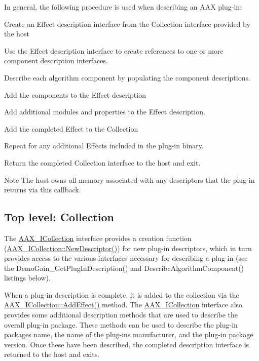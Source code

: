  In general, the following procedure is used when describing an A\+A\+X plug-\/in\+: 
\begin{DoxyEnumerate}
\item Create an Effect description interface from the Collection interface provided by the host  
\item Use the Effect description interface to create references to one or more component description interfaces.  
\item Describe each algorithm component by populating the component descriptions.  
\item Add the components to the Effect description 
\item Add additional modules and properties to the Effect description.  
\item Add the completed Effect to the Collection  
\item Repeat for any additional Effects included in the plug-\/in binary.  
\item Return the completed Collection interface to the host and exit.  
\end{DoxyEnumerate}

 \begin{DoxyNote}{Note}
The host owns all memory associated with any descriptors that the plug-\/in returns via this callback.
\end{DoxyNote}


 \hypertarget{a00326_describe_collection}{}\subsection{Top level\+: Collection}\label{a00326_describe_collection}
 The \hyperlink{a00087}{A\+A\+X\+\_\+\+I\+Collection} interface provides a creation function (\hyperlink{a00087_afab70588134a065a5b4d6ea6ddd5ddff}{A\+A\+X\+\_\+\+I\+Collection\+::\+New\+Descriptor()}) for new plug-\/in descriptors, which in turn provides access to the various interfaces necessary for describing a plug-\/in (see the {\ttfamily Demo\+Gain\+\_\+\+Get\+Plug\+In\+Description()} and {\ttfamily Describe\+Algorithm\+Component()} listings below).

 When a plug-\/in description is complete, it is added to the collection via the \hyperlink{a00087_a5ff114b8c4da2081515186f2faf65c8c}{A\+A\+X\+\_\+\+I\+Collection\+::\+Add\+Effect()} method. The \hyperlink{a00087}{A\+A\+X\+\_\+\+I\+Collection} interface also provides some additional description methods that are used to describe the overall plug-\/in package. These methods can be used to describe the plug-\/in package\textquotesingle{}s name, the name of the plug-\/in\textquotesingle{}s manufacturer, and the plug-\/in package version. Once these have been described, the completed description interface is returned to the host and exits.


